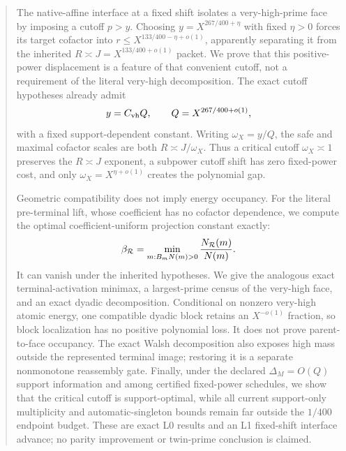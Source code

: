 \begin{abstract}
The native-affine interface at a fixed shift isolates a very-high-prime
face by imposing a cutoff \(p>y\).  Choosing
\(y=X^{267/400+\eta}\) with fixed \(\eta>0\) forces its target cofactor
into \(r\le X^{133/400-\eta+o(1)}\), apparently separating it from the
inherited \(R\asymp J=X^{133/400+o(1)}\) packet.  We prove that this
positive-power displacement is a feature of that convenient cutoff, not a
requirement of the literal very-high decomposition.  The exact cutoff
hypotheses already admit
\[
 y=C_{\rm vh}Q,
 \qquad Q=X^{267/400+o(1)},
\]
with a fixed support-dependent constant.  Writing \(\omega_X=y/Q\), the
safe and maximal cofactor scales are both
\(R\asymp J/\omega_X\).  Thus a critical cutoff
\(\omega_X\asymp1\) preserves the \(R\asymp J\) exponent, a subpower
cutoff shift has zero fixed-power cost, and only
\(\omega_X=X^{\eta+o(1)}\) creates the polynomial gap.

Geometric compatibility does not imply energy occupancy.  For the literal
pre-terminal lift, whose coefficient has no cofactor dependence, we compute
the optimal coefficient-uniform projection constant exactly:
\[
 \beta_{\cR}
 =\min_{m:B_mN(m)>0}\frac{N_{\cR}(m)}{N(m)}.
\]
It can vanish under the inherited hypotheses.  We give the analogous exact
terminal-activation minimax, a largest-prime census of the very-high face,
and an exact dyadic decomposition.  Conditional on nonzero very-high atomic
energy, one compatible dyadic block retains an
\(X^{-o(1)}\) fraction, so block localization has no positive polynomial
loss.  It does not prove parent-to-face occupancy.  The exact Walsh
decomposition also exposes high mass outside the represented terminal
image; restoring it is a separate nonmonotone reassembly gate.  Finally,
under the declared \(\Delta_M=O(Q)\) support information and among certified
fixed-power schedules, we show that the critical cutoff is support-optimal,
while all current support-only multiplicity and automatic-singleton bounds
remain far outside the \(1/400\) endpoint budget.  These are exact L0
results and an L1 fixed-shift interface advance; no parity improvement or
twin-prime conclusion is claimed.
\end{abstract}

